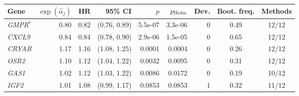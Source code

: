 \begin{tabular}{@{}lrrrrrrcc@{}}
\toprule
Gene & $\exp(\hat\alpha_j)$ & HR & 95\% CI & $p$ & $p_{\rm Holm}$ & Dev. & Boot. freq. & Methods \\
\midrule
\textit{GMPR}$^{\ast}$ & 0.80 & 0.82 & (0.76, 0.89) & 5.5e-07 & 3.3e-06 & 0 & 0.49 & 12/12 \\
\textit{CXCL9} & 0.84 & 0.84 & (0.78, 0.90) & 2.9e-06 & 1.5e-05 & 0 & 0.65 & 12/12 \\
\textit{CRYAB} & 1.17 & 1.16 & (1.08, 1.25) & 0.0001 & 0.0004 & 0 & 0.26 & 12/12 \\
\textit{OSR2} & 1.10 & 1.12 & (1.04, 1.22) & 0.0032 & 0.0095 & 0 & 0.31 & 12/12 \\
\textit{GAS1} & 1.02 & 1.12 & (1.03, 1.22) & 0.0086 & 0.0172 & 0 & 0.19 & 10/12 \\
\textit{IGF2} & 1.01 & 1.08 & (0.99, 1.17) & 0.0853 & 0.0853 & 1 & 0.32 & 11/12 \\
\bottomrule
\end{tabular}
